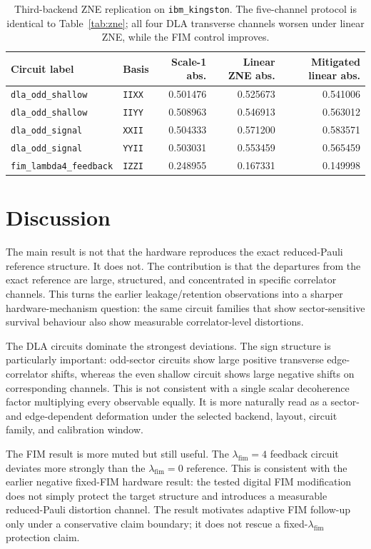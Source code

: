 \documentclass[preprint,aps,physrev,superscriptaddress,floatfix,longbibliography]{revtex4-2}
\begin{document}
\begin{table}[tb]
\centering
\small
\begin{tabular}{llrrr}
\toprule
Circuit label & Basis & Scale-1 abs. & Linear ZNE abs. & Mitigated linear abs. \\
\midrule
\texttt{dla\_odd\_shallow} & \texttt{IIXX} & 0.501476 & 0.525673 & 0.541006 \\
\texttt{dla\_odd\_shallow} & \texttt{IIYY} & 0.508963 & 0.546913 & 0.563012 \\
\texttt{dla\_odd\_signal} & \texttt{XXII} & 0.504333 & 0.571200 & 0.583571 \\
\texttt{dla\_odd\_signal} & \texttt{YYII} & 0.503031 & 0.553459 & 0.565459 \\
\texttt{fim\_lambda4\_feedback} & \texttt{IZZI} & 0.248955 & 0.167331 & 0.149998 \\
\bottomrule
\end{tabular}
\caption{Third-backend ZNE replication on \texttt{ibm\_kingston}. The
five-channel protocol is identical to Table~\ref{tab:zne}; all four DLA
transverse channels worsen under linear ZNE, while the FIM control improves.}
\label{tab:zne-kingston}
\end{table}

\section{Discussion}

The main result is not that the hardware reproduces the exact reduced-Pauli
reference structure. It does not. The contribution is that the departures from
the exact reference are large, structured, and concentrated in specific
correlator channels. This turns the earlier leakage/retention observations
into a sharper hardware-mechanism question: the same circuit families that show
sector-sensitive survival behaviour also show measurable correlator-level
distortions.

The DLA circuits dominate the strongest deviations. The sign structure is
particularly important: odd-sector circuits show large positive transverse
edge-correlator shifts, whereas the even shallow circuit shows large negative
shifts on corresponding channels. This is not consistent with a single scalar
decoherence factor multiplying every observable equally. It is more naturally
read as a sector- and edge-dependent deformation under the selected backend,
layout, circuit family, and calibration window.

The FIM result is more muted but still useful. The $\lambda_{\mathrm{fim}}=4$
feedback circuit deviates more strongly than the $\lambda_{\mathrm{fim}}=0$
reference. This is consistent with the earlier negative fixed-FIM hardware
result: the tested digital FIM modification does not simply protect the target
structure and introduces a measurable reduced-Pauli distortion channel. The
result motivates adaptive FIM follow-up only under a conservative claim
boundary; it does not rescue a fixed-$\lambda_{\mathrm{fim}}$ protection claim.
\end{document}
